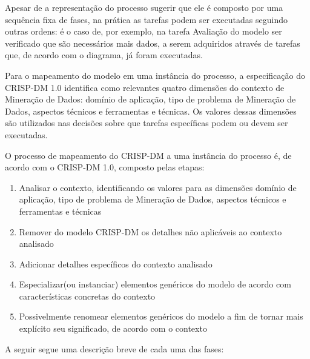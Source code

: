 Apesar de a representação do processo sugerir que ele é composto por uma sequência fixa de fases, na prática as tarefas podem ser executadas seguindo outras ordens: é o caso de, por exemplo, na tarefa Avaliação do modelo ser verificado que são necessários mais dados, a serem adquiridos através de tarefas que, de acordo com o diagrama, já foram executadas.

Para o mapeamento do modelo em uma instância do processo, a especificação do CRISP-DM 1.0 identifica como relevantes quatro dimensões do contexto de Mineração de Dados: domínio de aplicação, tipo de problema de Mineração de Dados, aspectos técnicos e ferramentas e técnicas. Os valores dessas dimensões são utilizados nas decisões sobre que tarefas específicas podem ou devem ser executadas.

O processo de mapeamento do CRISP-DM a uma instância do processo é, de acordo com o CRISP-DM 1.0, composto pelas etapas:
\begin{enumerate}
\item Analisar o contexto, identificando os valores para as dimensões domínio de aplicação, tipo de problema de Mineração de Dados, aspectos técnicos e ferramentas e técnicas
\item Remover do modelo CRISP-DM os detalhes não aplicáveis ao contexto analisado
\item Adicionar detalhes específicos do contexto analisado
\item Especializar(ou instanciar) elementos genéricos do modelo de acordo com características concretas do contexto
\item Possivelmente renomear elementos genéricos do modelo a fim de tornar mais explícito seu significado, de acordo com o contexto
\end{enumerate}



A seguir segue uma descrição breve de cada uma das fases:

